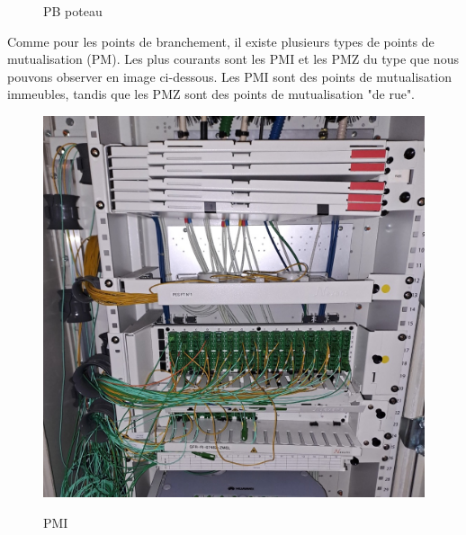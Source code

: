 \documentclass[12pt, a4paper]{article}
\begin{document}
\begin{figure}[htbp]
\begin{minipage}[b]{0.4\textwidth}
      \caption{PB poteau}
    \end{minipage}
\end{figure}

Comme pour les points de branchement, il existe plusieurs 
types de points de mutualisation (PM). Les plus courants 
sont les PMI et les PMZ du type que nous pouvons 
observer en image ci-dessous. Les PMI sont des points de mutualisation
immeubles, tandis que les PMZ sont des points de mutualisation
"de rue".\\
\begin{figure}[htbp]
    \centering
    \begin{minipage}[b]{0.4\textwidth}
		{\includegraphics[width=\textwidth]{img/pmi.jpg}}
      \caption{PMI}
    \end{minipage}
    \hspace{0.5cm} %
    \begin{minipage}[b]{0.4\textwidth}

\end{minipage}
\end{figure}
\end{document}
